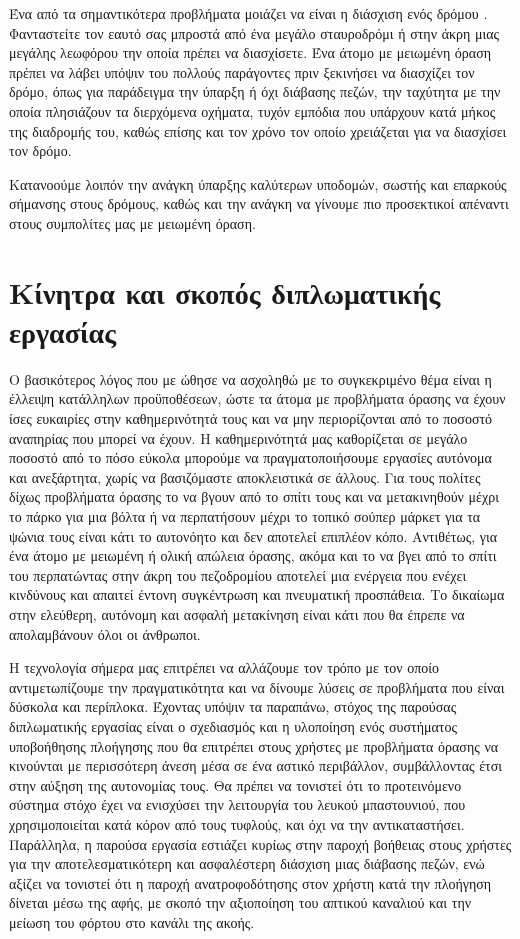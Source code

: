 Ένα από τα σημαντικότερα προβλήματα μοιάζει να είναι η διάσχιση ενός δρόμου \cite{alwi2013survey}. Φανταστείτε τον εαυτό σας μπροστά από ένα μεγάλο σταυροδρόμι ή στην άκρη μιας μεγάλης λεωφόρου την οποία πρέπει να διασχίσετε. Ένα άτομο με μειωμένη όραση πρέπει να λάβει υπόψιν του πολλούς παράγοντες πριν ξεκινήσει να διασχίζει τον δρόμο, όπως για παράδειγμα την ύπαρξη ή όχι διάβασης πεζών, την ταχύτητα με την οποία πλησιάζουν τα διερχόμενα οχήματα, τυχόν εμπόδια που υπάρχουν κατά μήκος της διαδρομής του, καθώς επίσης και τον χρόνο τον οποίο χρειάζεται για να διασχίσει τον δρόμο.

Κατανοούμε λοιπόν την ανάγκη ύπαρξης καλύτερων υποδομών, σωστής και επαρκούς σήμανσης στους δρόμους, καθώς και την ανάγκη να γίνουμε πιο προσεκτικοί απέναντι στους συμπολίτες μας με μειωμένη όραση.

\section{Κίνητρα και σκοπός διπλωματικής εργασίας}
Ο βασικότερος λόγος που με ώθησε να ασχοληθώ με το συγκεκριμένο θέμα είναι η έλλειψη κατάλληλων προϋποθέσεων, ώστε τα άτομα με προβλήματα όρασης να έχουν ίσες ευκαιρίες στην καθημερινότητά τους και να μην περιορίζονται από το ποσοστό αναπηρίας που μπορεί να έχουν. Η καθημερινότητά μας καθορίζεται σε μεγάλο ποσοστό από το πόσο εύκολα μπορούμε να πραγματοποιήσουμε εργασίες αυτόνομα και ανεξάρτητα, χωρίς να βασιζόμαστε αποκλειστικά σε άλλους. Για τους πολίτες δίχως προβλήματα όρασης το να βγουν από το σπίτι τους και να μετακινηθούν μέχρι το πάρκο για μια βόλτα ή να περπατήσουν μέχρι το τοπικό σούπερ μάρκετ για τα ψώνια τους είναι κάτι το αυτονόητο και δεν αποτελεί επιπλέον κόπο. Αντιθέτως, για ένα άτομο με μειωμένη ή ολική απώλεια όρασης, ακόμα και το να βγει από το σπίτι του περπατώντας στην άκρη του πεζοδρομίου αποτελεί μια ενέργεια που ενέχει κινδύνους και απαιτεί έντονη συγκέντρωση και πνευματική προσπάθεια. Το δικαίωμα στην ελεύθερη, αυτόνομη και ασφαλή μετακίνηση είναι κάτι που θα έπρεπε να απολαμβάνουν όλοι οι άνθρωποι.

Η τεχνολογία σήμερα μας επιτρέπει να αλλάζουμε τον τρόπο με τον οποίο αντιμετωπίζουμε την πραγματικότητα και να δίνουμε λύσεις σε προβλήματα που είναι δύσκολα και περίπλοκα. Έχοντας υπόψιν τα παραπάνω, στόχος της παρούσας διπλωματικής εργασίας είναι ο σχεδιασμός και η υλοποίηση ενός συστήματος υποβοήθησης πλοήγησης που θα επιτρέπει στους χρήστες με προβλήματα όρασης να κινούνται με περισσότερη άνεση μέσα σε ένα αστικό περιβάλλον, συμβάλλοντας έτσι στην αύξηση της αυτονομίας τους. Θα πρέπει να τονιστεί ότι το προτεινόμενο σύστημα στόχο έχει να ενισχύσει την λειτουργία του λευκού μπαστουνιού, που χρησιμοποιείται κατά κόρον από τους τυφλούς, και όχι να την αντικαταστήσει. Παράλληλα, η παρούσα εργασία εστιάζει κυρίως στην παροχή βοήθειας στους χρήστες για την αποτελεσματικότερη και ασφαλέστερη διάσχιση μιας διάβασης πεζών, ενώ αξίζει να τονιστεί ότι η παροχή ανατροφοδότησης στον χρήστη κατά την πλοήγηση δίνεται μέσω της αφής, με σκοπό την αξιοποίηση του απτικού καναλιού και την μείωση του φόρτου στο κανάλι της ακοής.

